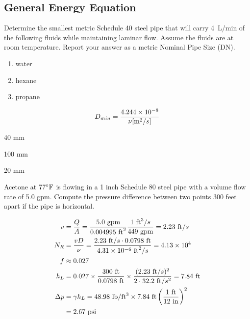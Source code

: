 \documentclass[multi,preview,varwidth=false,border=5,12pt]{standalone}
\begin{document}
\begin{center}
\section*{General Energy Equation}
\end{center}

\begin{question}

Determine the smallest metric Schedule 40 steel pipe that will carry 4~L/min of the following fluids while maintaining laminar flow.  Assume the fluids are at room temperature.  Report your answer as a metric Nominal Pipe Size (DN).

\begin{enumerate}

\item water

\item hexane

\item propane

\end{enumerate}


\begin{solution}
$$
D_{min}=\frac{4.244\times 10^{-8}}{\nu [\mathrm{m}^2/s]}
$$

40 mm

100 mm

20 mm

\end{solution}

\end{question}

\begin{question}
Acetone at $77^\circ\mathrm{F}$ is flowing in a 1 inch Schedule 80 steel pipe with a volume flow rate of 5.0 gpm. Compute the pressure difference between two points 300 feet apart if the pipe is horizontal.

\begin{solution}

\begin{align*}
v&=\frac{Q}{A}=\frac{5.0~\textrm{gpm}}{0.004995~\mathrm{ft}^2}\frac{1~\mathrm{ft}^3/s}{449~ \textrm{gpm}}=2.23~\mathrm{ft}/s \\
N_R&=\frac{vD}{\nu}=\frac{2.23~\mathrm{ft}/s\cdot 0.0798~\mathrm{ft}}{4.31\times 10^{-6}~\mathrm{ft}^2/s}=4.13\times 10^4 \\
f&\approx 0.027 \\
h_L&=0.027\times \frac{300~\mathrm{ft}}{0.0798~\mathrm{ft}}\times \frac{(2.23~\mathrm{ft}/s)^2}{2\cdot 32.2~\mathrm{ft}/s^2}=7.84~\mathrm{ft} \\
\Delta p&=\gamma h_L = 48.98~\mathrm{lb}/\mathrm{ft}^3\times 7.84~\mathrm{ft} \left(\frac{1~\mathrm{ft}}{12~\mathrm{in}}\right)^2\\
&=2.67~\mathrm{psi}
\end{align*}

\end{solution}

\end{question}
\end{document}
